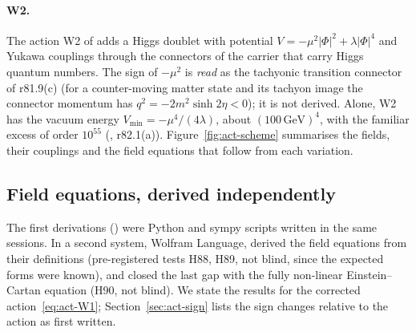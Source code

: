 \paragraph{W2.} The action W2 of  adds a Higgs doublet with potential
$V=-\mu^2|\Phi|^2+\lambda|\Phi|^4$ and Yukawa couplings through the connectors of the carrier that carry Higgs quantum
numbers. The sign of $-\mu^2$ is \emph{read} as the tachyonic transition connector of r81.9(c) (for a counter-moving
matter state and its tachyon image the connector momentum has $q^2=-2m^2\sinh2\eta<0$); it is not derived. Alone, W2 has
the vacuum energy $V_{\min}=-\mu^4/(4\lambda)$, about $(100\,\mathrm{GeV})^4$, with the familiar excess of order
$10^{55}$ (, r82.1(a)). Figure~\ref{fig:act-scheme} summarises the fields, their couplings and the field
equations that follow from each variation.



\subsection{Field equations, derived independently}
\label{sec:act-equations}

The first derivations () were Python and sympy scripts written in the same sessions. In  a second
system, Wolfram Language, derived the field equations from their definitions (pre-registered tests H88, H89, not blind,
since the expected forms were known), and  closed the last gap with the fully non-linear Einstein--Cartan
equation (H90, not blind). We state the results for the corrected action~\eqref{eq:act-W1}; Section~\ref{sec:act-sign}
lists the sign changes relative to the action as first written.

